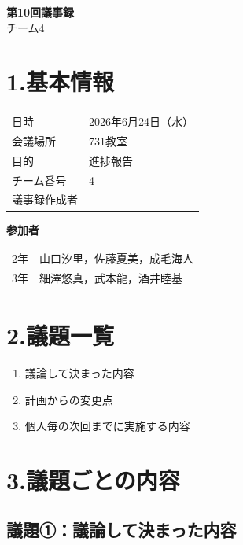 \documentclass[a4paper,12pt]{ltjsarticle}
\begin{document}
\begin{center}
  {\Large \textbf{第10回議事録}}\\[8pt]
  {\large チーム4}
\end{center}

\vspace{4mm}

\section*{1.基本情報}
\begin{tabular}{ll}
  \toprule
  日時     & 2026年6月24日（水） \\
  会議場所 & 731教室 \\
  目的     & 進捗報告 \\
  チーム番号 & 4 \\
  議事録作成者 &  \\
  \bottomrule
\end{tabular}

\vspace{4mm}
\noindent\textbf{参加者}

\begin{tabular}{ll}
  2年 & 山口汐里，佐藤夏美，成毛海人 \\
  3年 & 細澤悠真，武本龍，酒井睦基 \\
\end{tabular}

\section*{2.議題一覧}
\begin{enumerate}[label=議題\arabic*：]
  \item 議論して決まった内容
  \item 計画からの変更点
  \item 個人毎の次回までに実施する内容
\end{enumerate}

\section*{3.議題ごとの内容}

\subsection*{議題①：議論して決まった内容}
\end{document}
